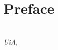 \chapter*{Preface}

\emph{\blindtext}

\begin{flushright}
{\makeatletter\itshape
    \@author \\
    UiA, \monthname{} \the\year{}
\makeatother}
\end{flushright}
